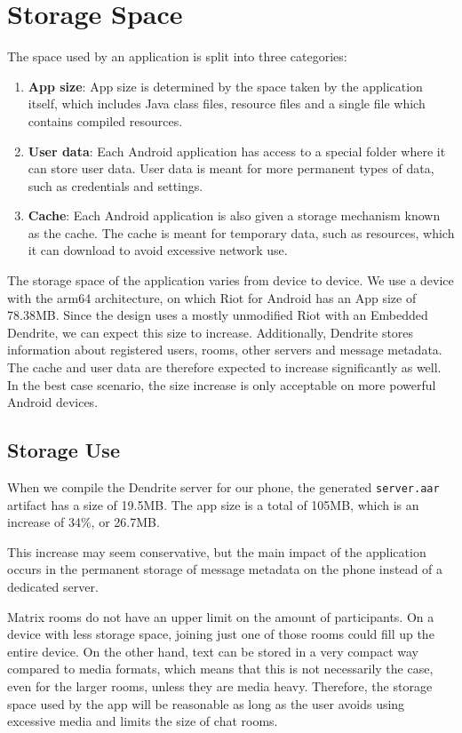 \section{Storage Space}\label{sec:storage_space}
The space used by an application is split into three categories:
\begin{enumerate}
	\item{
	      \textbf{App size}:
		  App size is determined by the space taken by the application itself, which includes Java class files, resource files and a single file which contains compiled resources\cite{android_devdocs_apksize}.
	      }
	\item{
	      \textbf{User data}:
		  Each Android application has access to a special folder where it can store user data.
		  User data is meant for more permanent types of data, such as credentials and settings.
	      }
	\item{
	      \textbf{Cache}:
		  Each Android application is also given a storage mechanism known as the cache.
		  The cache is meant for temporary data, such as resources, which it can download to avoid excessive network use.
	      }
\end{enumerate}

The storage space of the application varies from device to device.
We use a device with the arm64 architecture, on which Riot for Android has an App size of 78.38MB\@.
Since the design uses a mostly unmodified Riot with an Embedded Dendrite, we can expect this size to increase.
Additionally, Dendrite stores information about registered users, rooms, other servers and message metadata.
The cache and user data are therefore expected to increase significantly as well.
In the best case scenario, the size increase is only acceptable on more powerful Android devices.

\subsection{Storage Use}\label{sec:storage_use}
When we compile the Dendrite server for our phone, the generated \texttt{server.aar} artifact has a size of 19.5MB\@.
The app size is a total of 105MB\@, which is an increase of 34\%, or 26.7MB\@.

This increase may seem conservative, but the main impact of the application occurs in the permanent storage of message metadata on the phone instead of a dedicated server.

Matrix rooms do not have an upper limit on the amount of participants. On a device with less storage space, joining just one of those rooms could fill up the entire device.
On the other hand, text can be stored in a very compact way compared to media formats, which means that this is not necessarily the case, even for the larger rooms, unless they are media heavy.
Therefore, the storage space used by the app will be reasonable as long as the user avoids using excessive media and limits the size of chat rooms.


